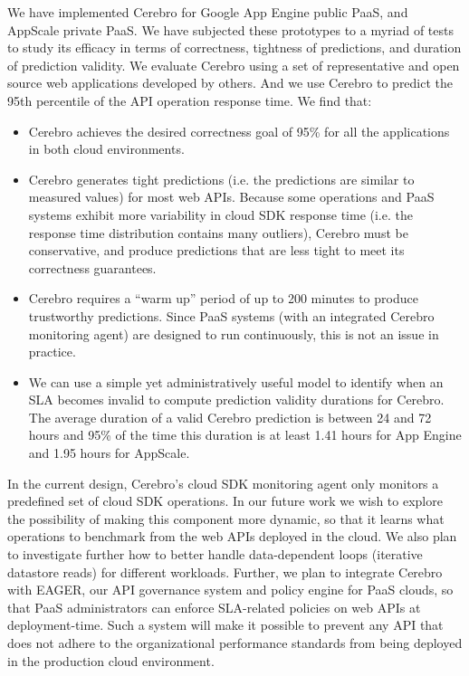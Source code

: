 We have implemented Cerebro for Google App Engine public PaaS, 
and AppScale private PaaS. We have subjected these
prototypes to a myriad of tests to study its efficacy in terms of
correctness, tightness of predictions, and duration of prediction 
validity.  We evaluate Cerebro using a set of representative
and open source web applications developed by others.  And we use Cerebro to
predict the 95th percentile of the API operation response time. 
We find that:
\begin{itemize}
\item Cerebro achieves the desired correctness goal of 95\% for all the applications in both cloud environments.
\item Cerebro generates tight predictions (i.e.
the predictions are similar to measured values) for most web APIs.  Because
some operations and PaaS systems exhibit more variability in cloud SDK response
time (i.e. the response time distribution contains many outliers), 
Cerebro must be conservative, and produce predictions that are less tight
to meet its correctness guarantees.  
\item Cerebro requires a ``warm up'' period of up to 200 minutes to produce trustworthy predictions. Since PaaS systems (with an integrated Cerebro monitoring agent) are designed to run continuously, this is not an issue in practice. 
\item We can use a simple yet administratively useful model to identify when an 
SLA becomes invalid to compute
prediction validity durations for Cerebro.  The average duration of a valid
Cerebro prediction is between 24 and 72 hours
and 95\% of the time this duration is at least 
1.41 hours for App Engine and 1.95 hours for AppScale.
\end{itemize}

In the current design, Cerebro's cloud SDK monitoring agent only monitors 
a predefined set of cloud SDK operations. In our future work we wish 
to explore the possibility of making this component more dynamic,
so that it learns what operations to benchmark from the web APIs 
deployed in the cloud. We also plan to investigate further how to better
handle data-dependent loops (iterative datastore reads) for different workloads. 
Further, we plan
to integrate Cerebro with EAGER, our API governance system 
and policy engine for PaaS clouds, so 
that PaaS administrators can enforce SLA-related policies on web APIs at deployment-time.
Such a system will make it possible to prevent any API that 
does not adhere to the organizational performance
standards from being deployed in the production cloud environment.
